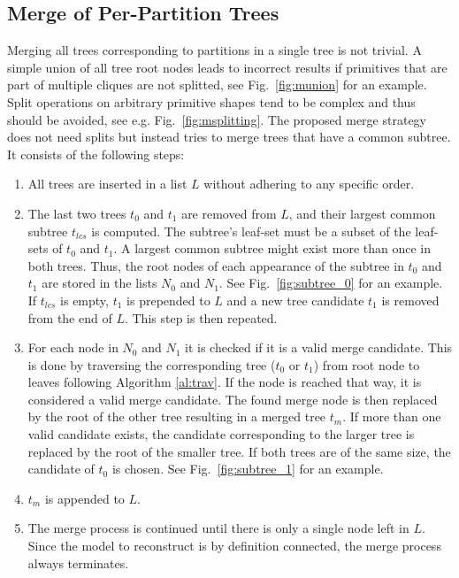 \subsection{Merge of Per-Partition Trees}
Merging all trees corresponding to partitions in a single tree is not trivial. 
A simple union of all tree root nodes leads to incorrect results if primitives that are part of multiple cliques are not splitted, see Fig.~\ref{fig:munion} for an example.
Split operations on arbitrary primitive shapes tend to be complex and thus should be avoided, see e.g. Fig.~\ref{fig:msplitting}.  
The proposed merge strategy does not need splits but instead tries to merge trees that have a common subtree.
It consists of the following steps:
\begin{enumerate}
	\item All trees are inserted in a list $L$ without adhering to any specific order.   
	\item The last two trees $t_0$ and $t_1$ are removed from $L$, and their largest common subtree $t_{lcs}$ is computed. The subtree's leaf-set must be a subset of the leaf-sets of $t_0$ and $t_1$. 
	A largest common subtree might exist more than once in both trees.
	Thus, the root nodes of each appearance of the subtree in $t_0$ and $t_1$ are stored in the lists $N_0$ and $N_1$.
	See Fig.~\ref{fig:subtree_0} for an example.
	\\	
	If $t_{lcs}$ is empty, $t_1$ is prepended to $L$ and a new tree candidate $t_1$ is removed from the end of $L$. This step is then repeated.
	\item For each node in $N_0$ and $N_1$ it is checked if it is a valid merge candidate.
	This is done by traversing the corresponding tree ($t_0$ or $t_1$) from root node to leaves following Algorithm \ref{al:trav}.
	If the node is reached that way, it is considered a valid merge candidate.
	The found merge node is then replaced by the root of the other tree resulting in a merged tree $t_m$.
	If more than one valid candidate exists, the candidate corresponding to the larger tree is replaced by the root of the smaller tree.
	If both trees are of the same size, the candidate of $t_0$ is chosen.  
	See Fig.~\ref{fig:subtree_1} for an example.
	\item $t_m$ is appended to $L$.
	\item The merge process is continued until there is only a single node left in $L$.
	Since the model to reconstruct is by definition connected, the merge process always terminates.
\end{enumerate}

